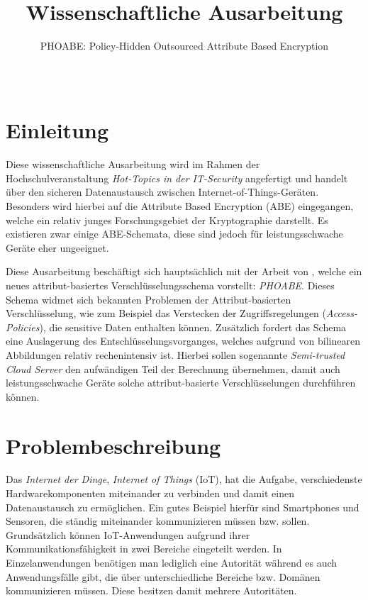 \documentclass{hsflensburg}
\title{Wissenschaftliche Ausarbeitung}
\subtitle{PHOABE: Policy-Hidden Outsourced Attribute Based Encryption}
\author{
	\name{Florian Hansen}\\
  \institution{Hochschule Flensburg}
}
\begin{document}
	\maketitle
	\begin{abstract}
	\end{abstract}

	\section{Einleitung}
	Diese wissenschaftliche Ausarbeitung wird im Rahmen der Hochschulveranstaltung
	\textit{Hot-Topics in der IT-Security} angefertigt und handelt über den
	sicheren Datenaustausch zwischen Internet-of-Things-Geräten.  Besonders wird
	hierbei auf die Attribute Based Encryption (ABE) eingegangen, welche ein
	relativ junges Forschungsgebiet der Kryptographie darstellt. Es existieren
	zwar einige ABE-Schemata, diese sind jedoch für leistungsschwache Geräte eher
	ungeeignet.

	Diese Ausarbeitung beschäftigt sich hauptsächlich mit der Arbeit von
	\cite{phoabe}, welche ein neues attribut-basiertes Verschlüsselungsschema
	vorstellt: \textit{PHOABE}. Dieses Schema widmet sich bekannten Problemen der
	Attribut-basierten Verschlüsselung, wie zum Beispiel das Verstecken der
	Zugriffsregelungen (\textit{Access-Policies}), die sensitive Daten enthalten
	können. Zusätzlich fordert das Schema eine Auslagerung des
	Entschlüsselungsvorganges, welches aufgrund von bilinearen Abbildungen relativ
	rechenintensiv ist. Hierbei sollen sogenannte \textit{Semi-trusted Cloud
	Server} den aufwändigen Teil der Berechnung über\-nehmen, damit auch
	leistungsschwache Geräte solche attribut-basierte Ver\-schlüs\-sel\-ung\-en
	durchführen können.

	\section{Problembeschreibung}
	Das \textit{Internet der Dinge}, \textit{Internet of Things} (IoT), hat die
	Aufgabe, verschiedenste Hardwarekomponenten miteinander zu verbinden und damit
	einen Datenaustausch zu ermöglichen. Ein gutes Beispiel hierfür sind
	Smartphones und Sensoren, die ständig miteinander kommunizieren müssen bzw.
	sollen. Grundsätzlich können IoT-Anwendungen aufgrund ihrer
	Kommunikationsfähigkeit in zwei Bereiche eingeteilt werden. In
	Einzelanwendungen be\-nö\-ti\-gen man lediglich eine Autorität während es auch
	Anwendungsfälle gibt, die über unterschiedliche Bereiche bzw. Domänen
	kommunizieren müssen. Diese besitzen damit mehrere Autoritäten.
\end{document}
